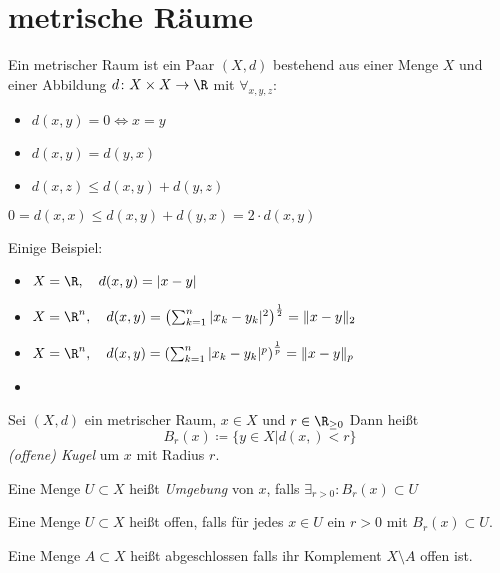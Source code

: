 \section{metrische Räume}
\begin{definition}
    Ein metrischer Raum ist ein Paar $(X,d)$ bestehend aus einer Menge $X$ und einer Abbildung $d \colon X \times X \to \R$ mit $\forall_{x,y,z}:$
    \begin{itemize}
        \item $d(x,y)= 0 \iff x=y$
        \item $d(x,y) = d(y,x)$ 
        \item $d(x,z) \le  d(x,y)+ d(y,z)$ 
    \end{itemize}
\end{definition}
\begin{remark}
$0 = d(x,x) \le d(x,y) + d(y,x) = 2 \cdot d(x,y)$ 
\end{remark}
\begin{example}
    Einige Beispiel:
\begin{itemize}
    \item $X= \R, \quad d(x,y) = |x-y|$
    \item $X= \R^{n}, \quad d(x,y) = \left(\sum_{k=1}^{n} |x_k -y_k|^2 \right)^{\frac{1}{2}} = \|x-y\|_2$ 
    \item $X = \R^{n}, \quad d(x,y) = \left(\sum_{k=1}^{n} |x_k-y_k|^{p}\right)^{\frac{1}{p}} = \|x-y\|_p$
    \item 
\end{itemize}
\end{example}
\begin{definition}
    Sei $(X,d)$ ein metrischer Raum, $x \in X$ und $r \in \R_{\ge 0}$ Dann heißt
    \[
    B_r(x) \coloneqq \{y \in X | d(x,) <r\} 
    \]
    \emph{(offene) Kugel} um $x$ mit Radius $r$. 
\end{definition}
\begin{definition}
    Eine Menge $U \subset X$ heißt \emph{Umgebung} von $x$, falls $\exists_{r>0}: B_r(x) \subset U$ 
\end{definition}
\begin{definition}
Eine Menge $U\subset X$ heißt offen, falls für jedes $x \in U$ ein $r>0$ mit $B_r(x)\subset U$. 
\end{definition}
\begin{definition}
Eine Menge $A\subset X$ heißt abgeschlossen falls ihr Komplement $X \setminus A$ offen ist.
\end{definition}
